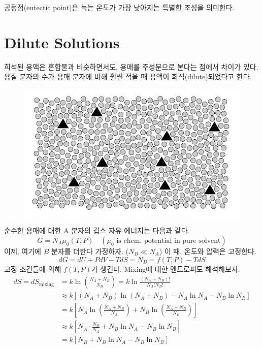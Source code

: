 \documentclass{article}
\begin{document}
공정점(eutectic point)은 녹는 온도가 가장 낮아지는 특별한 조성을 의미한다.

\newpage

\section{Dilute Solutions}

희석된 용액은 혼합물과 비슷하면서도, 용매를 주성분으로 본다는 점에서 차이가 있다. 용질 분자의 수가 용매 분자에 비해 훨씬 적을 때 용액이 희석(dilute)되었다고 한다. 

\begin{figure}[h]
    \centering
    \includegraphics[width=0.4\linewidth]{images/fig5_1.png}
\end{figure}


순수한 용매에 대한 A 분자의 깁스 자유 에너지는 다음과 같다.
\begin{equation}
    G = N_A \mu_0 (T,P) \quad (\mu_0 \text{ is chem. potential in pure solvent})
\end{equation}
이제, 여기에 $B$ 분자를 더한다 가정하자. ($N_B \ll N_A$) 이 때, 온도와 압력은 고정한다.
\begin{equation}
    dG = dU + PdV - TdS = N_B = f(T,P) -TdS
\end{equation}
고정 조건들에 의해 $f(T,P)$가 생긴다. Mixing에 대한 엔트로피도 해석해보자.
\begin{align}
    dS = dS_{\text{mixing}} &= k \ln \binom{N_A + N_B}{N_B} = k \ln \frac{(N_A + N_B)!}{N_A ! N_B !}\\
    &\approx k [ (N_A + N_B) \ln (N_A + N_B) - N_A \ln N_A - N_B \ln N_B]\\
    &= k \left[ N_A \ln \left( \frac{N_A + N_B}{N_A} \right) + N_B \ln \left( \frac{N_A + N_B}{N_B} \right) \right]\\
    &\approx k \left[ N_A \cdot \frac{N_B}{N_A} + N_B \ln N_A - N_B \ln N_B \right]\\
    &= k [N_B + N_B \ln N_A - N_B \ln N_B]
\end{align}
\end{document}
